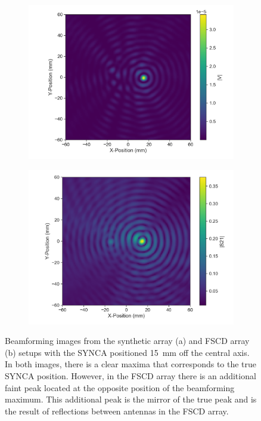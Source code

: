 \begin{figure}[htbp]
    \centering
    \begin{subfigure}[b]{0.48\textwidth}
        \includegraphics[width=1\textwidth]{figs/Chapter-5/230414_z00r15_synth_beamform.png}
        \caption{}
        \label{fig:synth-jugaad-bf-image}
    \end{subfigure}
    \hfill
    \begin{subfigure}[b]{0.48\textwidth}
        \includegraphics[width=1\textwidth]{figs/Chapter-5/230414_z00r15_jugaad_beamform_mean.png}
        \caption{}
        \label{fig:jugaad-bf-image}
    \end{subfigure}
    \hfill
    \caption{Beamforming images from the synthetic array (a) and FSCD array (b) setups with the SYNCA positioned 15~mm off the central axis. In both images, there is a clear maxima that corresponds to the true SYNCA position. However, in the FSCD array there is an additional faint peak located at the opposite position of the beamforming maximum. This additional peak is the mirror of the true peak and is the result of reflections between antennas in the FSCD array.}
    \label{fig:measured-bf-images}
\end{figure}

